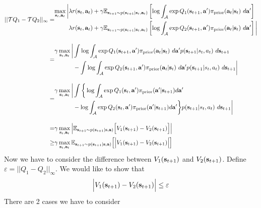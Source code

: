 \begin{equation}
    \begin{aligned}
        || \mathcal{T} Q_1 - \mathcal{T} Q_2 ||_{\infty}=&\begin{aligned}
             \max_{\bold{s}_t, \bold{a}_t} \bigg|  &\lambda r(\bold{s}_t, \bold{a}_t) + \gamma \mathbb{E}_{\bold{s}_{t+1} \sim p(\bold{s}_{t+1} | \bold{s}_t, \bold{a}_t)} \left[ \log \int_{\mathcal{A}} \exp Q_1(\bold{s}_{t+1}, \bold{a}' ) \pi_{\text{prior}}(\bold{a}_t | \bold{s}_t) \ d\bold{a}' \right] \\ 
            &\lambda r(\bold{s}_t, \bold{a}_t) + \gamma \mathbb{E}_{\bold{s}_{t+1} \sim p(\bold{s}_{t+1} | \bold{s}_t, \bold{a}_t)} \left[ \log \int_{\mathcal{A}} \exp Q_2(\bold{s}_{t+1}, \bold{a}' ) \pi_{\text{prior}}(\bold{a}_t | \bold{s}_t) \ d\bold{a}' \right] \bigg|
        \end{aligned} \\[10pt]
        =&\begin{aligned}
            \gamma \max_{\bold{s}_t, \bold{a}_t} \bigg| &\int \log \int_{\mathcal{A}} \exp Q_1(\bold{s}_{t+1}, \bold{a}' ) \pi_{\text{prior}}(\bold{a}_t | \bold{s}_t) \ d\bold{a}' p(\bold{s}_{t+1} | s_t, a_t) \ d\bold{s}_{t+1}  \\
            &-\int\log \int_{\mathcal{A}} \exp Q_2(\bold{s}_{t+1}, \bold{a}' ) \pi_{\text{prior}}(\bold{a}_t | \bold{s}_t) \ d\bold{a}' p(\bold{s}_{t+1} | s_t, a_t) \ d\bold{s}_{t+1}  \bigg|
        \end{aligned} \\[10pt]
        =& \begin{aligned}
            \gamma \max_{\bold{s}_t, \bold{a}_t} \bigg| &\int\bigg\{ \log \int_{\mathcal{A}} \exp Q_1(\bold{s}_t, \bold{a}') \pi_{\text{prior}} (\bold{a}' | \bold{s}_{t+1}) d\bold{a}' \\ 
            &-\log \int_{\mathcal{A}} \exp Q_2(\bold{s}_t, \bold{a}') \pi_{\text{prior}} (\bold{a}' | \bold{s}_{t+1}) d\bold{a}' \bigg\} p(\bold{s}_{t+1} | s_t, a_t) \ d\bold{s}_{t+1}\bigg|
        \end{aligned} \\[10pt]
        =& \gamma\max_{\bold{s}_t, \bold{a}_t} \Big| \mathbb{E}_{\bold{s}_{t+1} \sim p(\bold{s}_{t+1} | \bold{s}, \bold{a})} \Big[ V_1(\bold{s}_{t+1}) - V_2(\bold{s}_{t+1}) \Big]  \Big| \\
        \ge & \gamma\max_{\bold{s}_t, \bold{a}_t}  \mathbb{E}_{\bold{s}_{t+1} \sim p(\bold{s}_{t+1} | \bold{s}, \bold{a})} \Big[\Big| V_1(\bold{s}_{t+1}) - V_2(\bold{s}_{t+1})  \Big|\Big] 
    \end{aligned}
\end{equation}
Now we have to consider the difference between $V_1(\bold{s}_{t+1})$ and $V_2(\bold{s}_{t+1})$. Define $\varepsilon = || Q_1 - Q_2 ||_{\infty}$. We would like to show that 
$$
\Big| V_1(\bold{s}_{t+1}) - V_2(\bold{s}_{t+1})  \Big| \le \varepsilon
$$
There are 2 cases we have to consider 
